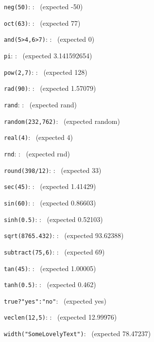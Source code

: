 \documentclass{article}
\begin{document}
\verb|neg(50)|:
    :
   \pgfmathresult\ (expected  -50)

\verb|oct(63)|:
    :
   \pgfmathresult\ (expected  77)

\verb|and(5>4,6>7)|:
    :
   \pgfmathresult\ (expected  0)

\verb|pi|:
    :
   \pgfmathresult\ (expected  3.141592654)

\verb|pow(2,7)|:
    :
   \pgfmathresult\ (expected  128)

\verb|rad(90)|:
    :
   \pgfmathresult\ (expected  1.57079)

\verb|rand|:
    :
   \pgfmathresult\ (expected  rand)

\verb|random(232,762)|:
   \pgfmathresult\ (expected  random)

\verb|real(4)|:
   \pgfmathresult\ (expected  4)

\verb|rnd|:
    :
   \pgfmathresult\ (expected  rnd)

\verb|round(398/12)|:
    :
   \pgfmathresult\ (expected  33)

\verb|sec(45)|:
    :
   \pgfmathresult\ (expected  1.41429)

\verb|sin(60)|:
    :
   \pgfmathresult\ (expected  0.86603)

\verb|sinh(0.5)|:
    :
   \pgfmathresult\ (expected  0.52103)

\verb|sqrt(8765.432)|:
    :
   \pgfmathresult\ (expected  93.62388)

\verb|subtract(75,6)|:
    :
   \pgfmathresult\ (expected  69)

\verb|tan(45)|:
    :
   \pgfmathresult\ (expected  1.00005)

\verb|tanh(0.5)|:
    :
   \pgfmathresult\ (expected  0.462)

\verb|true?"yes":"no"|:
   \pgfmathresult\ (expected  yes)

\verb|veclen(12,5)|:
    :
   \pgfmathresult\ (expected  12.99976)

\verb|width("SomeLovelyText")|:
   \pgfmathresult\ (expected  78.47237)
\end{document}
